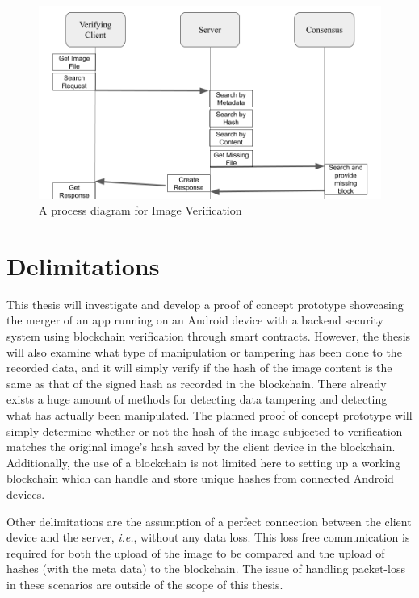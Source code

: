 \begin{figure}
\begin{center}
\includegraphics[width=\textwidth]{./img_src/img_verify.png}
\end{center}
\label{fig_imgVerify}
\caption{A process diagram for Image Verification}
\end{figure}

\section{Delimitations}
\label{sec:boundary}
This thesis will investigate and develop a proof of concept prototype showcasing the merger of an app running on an Android device with a backend security system using blockchain verification through smart contracts. However, the thesis will also examine what type of manipulation or tampering has been done to the recorded data, and it will simply verify if the hash of the image content is the same as that of the signed hash as recorded in the blockchain. There already exists a huge amount of methods for detecting data tampering and detecting what has actually been manipulated. The planned proof of concept prototype will simply determine whether or not the hash of the image subjected to verification matches the original image's hash saved by the client device in the blockchain. Additionally, the use of a blockchain is not limited here to setting up a working blockchain which can handle and store unique hashes from connected Android devices.

Other delimitations are the assumption of a perfect connection between the client device and the server, \textit{i.e.}, without any data loss. This loss free communication is required for both the upload of the image to be compared and the upload of hashes (with the meta data) to the blockchain. The issue of handling packet-loss in these scenarios are outside of the scope of this thesis.

